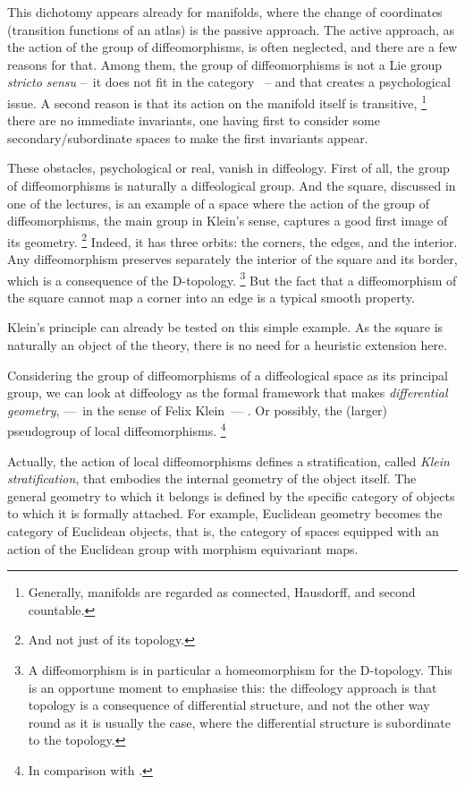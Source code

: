 This dichotomy appears already for manifolds,
where the change of coordinates (transition functions of an atlas) is the passive approach.
The active approach,
as the action of the group of diffeomorphisms,
is often neglected,
and there are a few reasons for that.
Among them,
the group of diffeomorphisms is not a Lie group {\em stricto sensu}
--~it does not fit in the category ~--
and that creates a psychological issue.
A second reason is that its action on the manifold itself is transitive,%
\footnote{Generally,
manifolds are regarded as connected,
Hausdorff,
and second countable.}
there are no immediate invariants,
one having first to consider some secondary/subordinate spaces to make the first invariants appear.

These obstacles,
psychological or real,
vanish in diffeology.
First of all,
the group of diffeomorphisms is naturally a diffeological group.
And the square,
discussed in one of the lectures,
is an example of a space where the action of the group of diffeomorphisms,
the main group in Klein's sense,
captures a good first image of its geometry.%
\footnote{And not just of its topology.}
Indeed,
it has three orbits:
the corners,
the edges,
and the interior.
Any diffeomorphism preserves separately the interior of the square and its border,
which is a consequence of the D-topology.%
\footnote{A diffeomorphism is in particular a homeomorphism for the D-topology.
This is an opportune moment to emphasise this:
the diffeology approach is that topology is a consequence of differential structure,
and not the other way round as it is usually the case,
where the differential structure is subordinate to the topology.}
But the fact that a diffeomorphism of the square cannot map a corner into an edge is a typical smooth property.

Klein's principle can already be tested on this simple example.
As the square is naturally an object of the theory,
there is no need for a heuristic extension here.

 Considering the group of diffeomorphisms of a diffeological space as its principal group,
we can look at diffeology as the formal framework that makes {\em differential geometry},
 ---~in the sense of Felix Klein~--- .
Or possibly,
the (larger) pseudogroup of local diffeomorphisms.%
\footnote{In comparison with \cite{Sou03}.}

Actually,
the action of local diffeomorphisms defines a stratification,
called \emph{Klein stratification},
that embodies the internal geometry of the object itself.
The general geometry to which it belongs is defined by the specific category of objects to which it is formally attached.
For example,
Euclidean geometry becomes the category of Euclidean objects,
that is,
the category of spaces equipped with an action of the Euclidean group with morphism equivariant maps.

